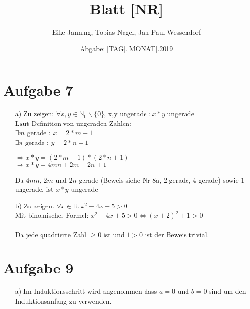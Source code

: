 \documentclass[paper = a4, ngerman]{scrartcl}
\title{Blatt [NR]}
\author{Eike Janning, Tobias Nagel, Jan Paul Wessendorf}
\date{Abgabe: [TAG].[MONAT].2019}
\begin{document}
	\maketitle
	\hrulefill
	
	\section*{Aufgabe 7}
		\begin{itemize}
			\item[a)] Zu zeigen: $\forall x,y \in \mathbb{N}_0 \backslash \{ 0 \}$, x,y ungerade $: x*y$ ungerade\\
			Laut Definition von ungeraden Zahlen:\\
			$\exists m$ gerade : $x = 2*m+1$\\
			$\exists n$ gerade : $y = 2*n+1$
			\begin{center}
				$\Rightarrow x*y = (2*m+1)*(2*n+1)$\\
				$\Rightarrow x*y = 4mn + 2m + 2n + 1$
			\end{center}
			Da $4mn$, $2m$ und $2n$ gerade (Beweis siehe Nr 8a, 2 gerade, 4 gerade) sowie $1$ ungerade, ist $x*y$ ungerade
			
			\item[b)] Zu zeigen: $\forall x \in \mathbb{R} : x^2 - 4x + 5 > 0$\\
			Mit binomischer Formel: $x^2 - 4x + 5 > 0 \Leftrightarrow (x + 2)^2 + 1 > 0$\\\\
			Da jede quadrierte Zahl $\ge 0$ ist und $1 > 0$ ist der Beweis trivial.
		\end{itemize}
	
	
	\section*{Aufgabe 9}
		\begin{itemize}
			\item[a)] Im Induktionsschritt wird angenommen dass $a=0$ und $b=0$ sind um den Induktionsanfang zu verwenden.
		\end{itemize}
\end{document}

